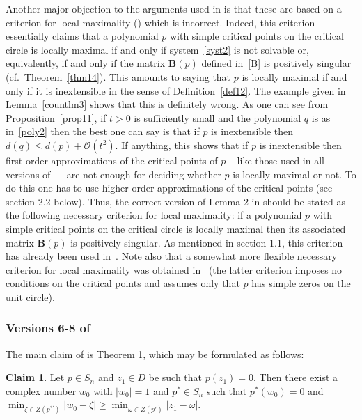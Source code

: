 \documentclass[10pt,twoside,a4paper,reqno]{amsart}
\theoremstyle{plain}
\theoremstyle{definition}
\newtheorem{claim}   {Claim}
\begin{document}
{Another major objection to the arguments used in \cite[v3-v5]{S1} is that 
these are based on a criterion for local maximality 
(\cite[v3-v4, Lemma 2]{S1}) which is incorrect. Indeed, this criterion 
essentially claims that a polynomial $p$ with simple critical points on the 
critical circle is locally maximal if and only if system~\eqref{syst2} is not 
solvable or, equivalently, if and only if the matrix $\mathbf{B}(p)$ defined 
in~\eqref{B} is 
positively singular (cf.~Theorem~\ref{thm14}). This amounts to saying that 
$p$ is locally maximal if and only if it is
inextensible in the sense of Definition~\ref{def12}. The example given in
Lemma~\ref{countlm3} shows 
that this is definitely wrong. As one can see from Proposition~\ref{prop11}, 
if $t>0$ is sufficiently 
small and the polynomial $q$ is as in~\eqref{poly2} then the best one can 
say is that if $p$ is inextensible then $d(q)\le d(p)+\mathcal{O}(t^2)$. 
If anything, this shows that if $p$ is inextensible then first order 
approximations of the critical points of $p$ -- like those used in all 
versions of~\cite{S1} -- are not enough for deciding whether $p$ is locally 
maximal or not. To do this one has to use higher order 
approximations of the critical points (see section 2.2 below). Thus, the 
correct version of Lemma 2 in \cite[v3-v4]{S1} should be stated as the 
following necessary criterion for local maximality: if a polynomial $p$ with 
simple critical points on the critical circle is locally maximal then 
its associated matrix $\mathbf{B}(p)$ is positively singular. As mentioned
in section 1.1, this criterion has already been used in~\cite{M1}.
Note also that a somewhat more flexible necessary criterion for 
local maximality was obtained in~\cite{B} (the latter criterion 
imposes no conditions on the critical points and assumes only
that $p$ has simple zeros on the unit circle).

\subsubsection*{Versions 6-8 of~\cite{S1}} The main 
claim of \cite[v6-v8]{S1} is Theorem 1, which may be formulated as follows:

\begin{claim}\label{v8cl1}
Let $p\in S_n$ and $z_1\in D$ be such that $p(z_1)=0$. Then there exist a 
complex number $w_0$ with $|w_0|=1$ and $p^{*}\in S_n$ such that 
$p^{*}(w_0)=0$ and $\min_{\zeta\in Z(p^{*'})}|w_0-\zeta|\ge 
\min_{\omega\in Z(p')}|z_1-\omega|$.
\end{claim}

}
\end{document}
